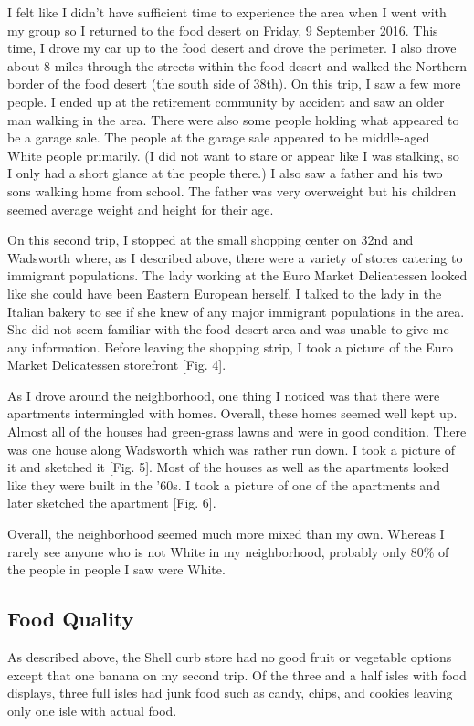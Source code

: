 \documentclass[11pt]{article}
\begin{document}
I felt like I didn't have sufficient time to experience the area when I went with my group so I
returned to the food desert on Friday, 9 September 2016. This time, I drove my car up to the food
desert and drove the perimeter. I also drove about 8 miles through the streets within the food
desert and walked the Northern border of the food desert (the south side of 38th). On this trip, I
saw a few more people. I ended up at the retirement community by accident and saw an older man
walking in the area. There were also some people holding what appeared to be a garage sale. The
people at the garage sale appeared to be middle-aged White people primarily. (I did not want to
stare or appear like I was stalking, so I only had a short glance at the people there.) I also saw a
father and his two sons walking home from school. The father was very overweight but his children
seemed average weight and height for their age.

On this second trip, I stopped at the small shopping center on 32nd and Wadsworth where, as I
described above, there were a variety of stores catering to immigrant populations. The lady working
at the Euro Market Delicatessen looked like she could have been Eastern European herself. I
talked to the lady in the Italian bakery to see if she knew of any major immigrant populations in
the area. She did not seem familiar with the food desert area and was unable to give me any
information. Before leaving the shopping strip, I took a picture of the Euro Market Delicatessen
storefront [Fig. 4].

As I drove around the neighborhood, one thing I noticed was that there were apartments intermingled
with homes. Overall, these homes seemed well kept up. Almost all of the houses had green-grass lawns
and were in good condition. There was one house along Wadsworth which was rather run down. I took a
picture of it and sketched it [Fig. 5]. Most of the houses as well as the apartments looked like
they were built in the '60s. I took a picture of one of the apartments and later sketched the
apartment [Fig. 6].

Overall, the neighborhood seemed much more mixed than my own. Whereas I rarely see anyone who is not
White in my neighborhood, probably only $80\%$ of the people in people I saw were White.

\subsection{Food Quality}
As described above, the Shell curb store had no good fruit or vegetable options except that one
banana on my second trip. Of the three and a half isles with food displays, three full isles had
junk food such as candy, chips, and cookies leaving only one isle with actual food.
\end{document}
